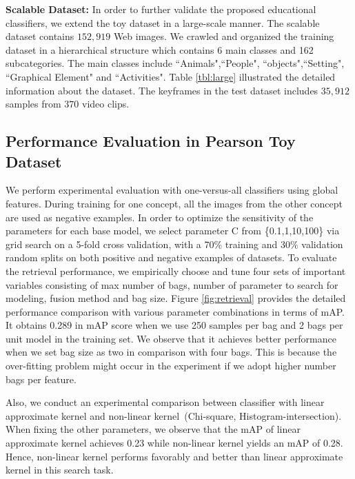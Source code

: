 \documentclass[11pt,twocolumn,twoside]{IEEEtran}
\begin{document}
\textbf{Scalable Dataset:} In order to further validate the proposed educational classifiers, we extend the toy dataset in a large-scale manner.  The scalable dataset contains $152,919$ Web images.
 We crawled and organized the training dataset in a hierarchical structure which contains 6 main classes and 162 subcategories. The main classes include ``Animals",``People", ``objects",``Setting",
 ``Graphical Element" and ``Activities". Table \ref{tbl:large} illustrated the detailed information about the dataset.
 The keyframes in the test dataset includes $35,912$ samples from $370$ video clips.

\subsection{Performance Evaluation in Pearson Toy Dataset}

We perform experimental evaluation with one-versus-all classifiers using global features.
During training for one concept, all the images from the other concept are used as negative examples.
In order to optimize the sensitivity of the parameters for each base model, we select parameter C from \{0.1,1,10,100\} via grid search on a 5-fold cross validation, with a 70\% training and 30$\%$ validation random splits on both
positive and negative examples of datasets.
To evaluate the retrieval performance, we empirically choose and tune four sets of important variables consisting of max number of bags, number of parameter to search for modeling, fusion method and bag size.
Figure \ref{fig:retrieval} provides the detailed performance comparison with various parameter combinations in terms of mAP.
It obtains 0.289 in mAP score when we use 250 samples per bag and 2 bags per unit model in the training set.
We observe that it achieves better performance when we set bag size as two in comparison with four bags.
This is because the over-fitting problem might occur in the experiment if we adopt higher number bags per feature.

Also, we conduct an experimental comparison between classifier with linear approximate kernel \cite{MED} and non-linear kernel~(Chi-square, Histogram-intersection).
When fixing the other parameters, we observe that the mAP of linear approximate kernel achieves 0.23 while non-linear kernel yields an mAP of 0.28.
Hence, non-linear kernel performs favorably and better than linear approximate kernel in this search task.
\end{document}
